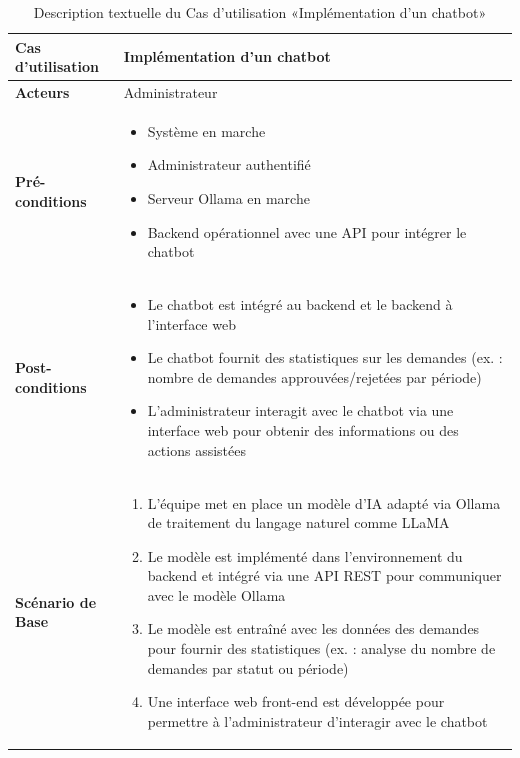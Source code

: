 \begin{table}[!ht]
    \begin{adjustwidth}{-3.5cm}{-3.5cm}
    \vspace*{-2cm}
    \centering
    \caption{Description textuelle du Cas d’utilisation «Implémentation d’un chatbot»}
    \label{tab:implement_chatbot}
    \renewcommand{\arraystretch}{1.2}
    \begin{tabular}{|p{4.2cm}|p{11cm}|}
    \hline
    \textbf{Cas d'utilisation} & Implémentation d’un chatbot \\
    \hline
    \textbf{Acteurs} & Administrateur \\
    \hline
    \textbf{Pré-conditions} & 
    \begin{itemize}
    \item Système en marche
    \item Administrateur authentifié
    \item Serveur Ollama en marche
    \item Backend opérationnel avec une API pour intégrer le chatbot
    \end{itemize} \\
    \hline
    \textbf{Post-conditions} & 
    \begin{itemize}
    \item Le chatbot est intégré au backend et le backend à l’interface web
    \item Le chatbot fournit des statistiques sur les demandes (ex. : nombre de demandes approuvées/rejetées par période)
    \item L’administrateur interagit avec le chatbot via une interface web pour obtenir des informations ou des actions assistées
    \end{itemize} \\
    \hline
    \textbf{Scénario de Base} & 
    \begin{enumerate}
    \item L’équipe met en place un modèle d’IA adapté via Ollama de traitement du langage naturel comme LLaMA
    \item Le modèle est implémenté dans l’environnement du backend et intégré via une API REST pour communiquer avec le modèle Ollama
    \item Le modèle est entraîné avec les données des demandes pour fournir des statistiques (ex. : analyse du nombre de demandes par statut ou période)
    \item Une interface web front-end est développée pour permettre à l’administrateur d’interagir avec le chatbot

\end{enumerate}
\end{tabular}
\end{adjustwidth}
\end{table}
